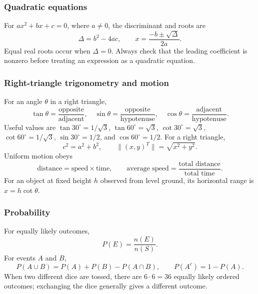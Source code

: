 \renewcommand{\theequation}{1.1.1.\arabic{equation}}
\setcounter{equation}{0}

\subsubsection*{Quadratic equations}
For $ax^2+bx+c=0$, where $a\ne0$, the discriminant and roots are
\begin{equation}
\Delta=b^2-4ac,\qquad x=\frac{-b\pm\sqrt{\Delta}}{2a}.
\label{eq:quad-general}
\end{equation}
Equal real roots occur when $\Delta=0$. Always check that the leading coefficient is nonzero before treating an expression as a quadratic equation.

\subsubsection*{Right-triangle trigonometry and motion}
For an angle $\theta$ in a right triangle,
\begin{equation}
\tan\theta=\frac{\text{opposite}}{\text{adjacent}},\quad
\sin\theta=\frac{\text{opposite}}{\text{hypotenuse}},\quad
\cos\theta=\frac{\text{adjacent}}{\text{hypotenuse}}.
\label{eq:trig-ratios}
\end{equation}
Useful values are $\tan30^\circ=1/\sqrt3$, $\tan60^\circ=\sqrt3$, $\cot30^\circ=\sqrt3$, $\cot60^\circ=1/\sqrt3$, $\sin30^\circ=1/2$, and $\cos60^\circ=1/2$. For a right triangle,
\begin{equation}
c^2=a^2+b^2,\qquad \|(x,y)^T\|=\sqrt{x^2+y^2}.
\label{eq:pythagoras-distance}
\end{equation}
Uniform motion obeys
\begin{equation}
\text{distance}=\text{speed}\times\text{time},\qquad
\text{average speed}=\frac{\text{total distance}}{\text{total time}}.
\label{eq:speed-time}
\end{equation}
For an object at fixed height $h$ observed from level ground, its horizontal range is $x=h\cot\theta$.

\subsubsection*{Probability}
For equally likely outcomes,
\begin{equation}
P(E)=\frac{n(E)}{n(S)}.
\label{eq:prob-classical}
\end{equation}
For events $A$ and $B$,
\begin{equation}
P(A\cup B)=P(A)+P(B)-P(A\cap B),\qquad P(A^c)=1-P(A).
\label{eq:prob-union}
\end{equation}
When two different dice are tossed, there are $6\cdot6=36$ equally likely ordered outcomes; exchanging the dice generally gives a different outcome.

